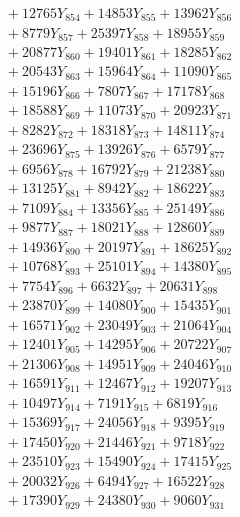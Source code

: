 \documentclass[a4paper,10pt]{article}
\begin{document}
{\begin{align}
&\;  + 12765 Y_{854} + 14853 Y_{855} + 13962 Y_{856} \\[0.3ex]
&\;  + 8779 Y_{857} + 25397 Y_{858} + 18955 Y_{859} \\[0.3ex]
&\;  + 20877 Y_{860} + 19401 Y_{861} + 18285 Y_{862} \\[0.3ex]
&\;  + 20543 Y_{863} + 15964 Y_{864} + 11090 Y_{865} \\[0.3ex]
&\;  + 15196 Y_{866} + 7807 Y_{867} + 17178 Y_{868} \\[0.5ex]\allowbreak
&\;  + 18588 Y_{869} + 11073 Y_{870} + 20923 Y_{871} \\[0.3ex]
&\;  + 8282 Y_{872} + 18318 Y_{873} + 14811 Y_{874} \\[0.3ex]
&\;  + 23696 Y_{875} + 13926 Y_{876} + 6579 Y_{877} \\[0.3ex]
&\;  + 6956 Y_{878} + 16792 Y_{879} + 21238 Y_{880} \\[0.3ex]
&\;  + 13125 Y_{881} + 8942 Y_{882} + 18622 Y_{883} \\[0.3ex]
&\;  + 7109 Y_{884} + 13356 Y_{885} + 25149 Y_{886} \\[0.3ex]
&\;  + 9877 Y_{887} + 18021 Y_{888} + 12860 Y_{889} \\[0.3ex]
&\;  + 14936 Y_{890} + 20197 Y_{891} + 18625 Y_{892} \\[0.3ex]
&\;  + 10768 Y_{893} + 25101 Y_{894} + 14380 Y_{895} \\[0.3ex]
&\;  + 7754 Y_{896} + 6632 Y_{897} + 20631 Y_{898} \\[0.5ex]\allowbreak
&\;  + 23870 Y_{899} + 14080 Y_{900} + 15435 Y_{901} \\[0.3ex]
&\;  + 16571 Y_{902} + 23049 Y_{903} + 21064 Y_{904} \\[0.3ex]
&\;  + 12401 Y_{905} + 14295 Y_{906} + 20722 Y_{907} \\[0.3ex]
&\;  + 21306 Y_{908} + 14951 Y_{909} + 24046 Y_{910} \\[0.3ex]
&\;  + 16591 Y_{911} + 12467 Y_{912} + 19207 Y_{913} \\[0.3ex]
&\;  + 10497 Y_{914} + 7191 Y_{915} + 6819 Y_{916} \\[0.3ex]
&\;  + 15369 Y_{917} + 24056 Y_{918} + 9395 Y_{919} \\[0.3ex]
&\;  + 17450 Y_{920} + 21446 Y_{921} + 9718 Y_{922} \\[0.3ex]
&\;  + 23510 Y_{923} + 15490 Y_{924} + 17415 Y_{925} \\[0.3ex]
&\;  + 20032 Y_{926} + 6494 Y_{927} + 16522 Y_{928} \\[0.5ex]\allowbreak
&\;  + 17390 Y_{929} + 24380 Y_{930} + 9060 Y_{931} \\[0.3ex]

\end{align}}
\end{document}
